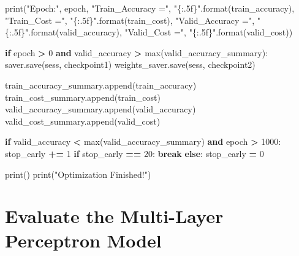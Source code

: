 \documentclass[]{book}
\newenvironment{Shaded}{\begin{snugshade}}{\end{snugshade}}
\newcommand{\KeywordTok}[1]{\textcolor[rgb]{0.13,0.29,0.53}{\textbf{#1}}}
\newcommand{\DecValTok}[1]{\textcolor[rgb]{0.00,0.00,0.81}{#1}}
\newcommand{\SpecialCharTok}[1]{\textcolor[rgb]{0.00,0.00,0.00}{#1}}
\newcommand{\StringTok}[1]{\textcolor[rgb]{0.31,0.60,0.02}{#1}}
\newcommand{\ControlFlowTok}[1]{\textcolor[rgb]{0.13,0.29,0.53}{\textbf{#1}}}
\newcommand{\OperatorTok}[1]{\textcolor[rgb]{0.81,0.36,0.00}{\textbf{#1}}}
\newcommand{\BuiltInTok}[1]{#1}
\newcommand{\NormalTok}[1]{#1}
\begin{document}
\begin{Shaded}
\begin{Highlighting}[]
        \BuiltInTok{print}\NormalTok{(}\StringTok{"Epoch:"}\NormalTok{, epoch,}
              \StringTok{"Train_Accuracy ="}\NormalTok{, }\StringTok{"}\SpecialCharTok{\{:.5f\}}\StringTok{"}\NormalTok{.}\BuiltInTok{format}\NormalTok{(train_accuracy),}
              \StringTok{"Train_Cost ="}\NormalTok{, }\StringTok{"}\SpecialCharTok{\{:.5f\}}\StringTok{"}\NormalTok{.}\BuiltInTok{format}\NormalTok{(train_cost), }
              \StringTok{"Valid_Accuracy ="}\NormalTok{, }\StringTok{"}\SpecialCharTok{\{:.5f\}}\StringTok{"}\NormalTok{.}\BuiltInTok{format}\NormalTok{(valid_accuracy),}
              \StringTok{"Valid_Cost ="}\NormalTok{, }\StringTok{"}\SpecialCharTok{\{:.5f\}}\StringTok{"}\NormalTok{.}\BuiltInTok{format}\NormalTok{(valid_cost))}

        \ControlFlowTok{if}\NormalTok{ epoch }\OperatorTok{>} \DecValTok{0} \KeywordTok{and}\NormalTok{ valid_accuracy }\OperatorTok{>} \BuiltInTok{max}\NormalTok{(valid_accuracy_summary):}
\NormalTok{            saver.save(sess, checkpoint1)}
\NormalTok{            weights_saver.save(sess, checkpoint2)}

\NormalTok{        train_accuracy_summary.append(train_accuracy)}
\NormalTok{        train_cost_summary.append(train_cost)}
\NormalTok{        valid_accuracy_summary.append(valid_accuracy)}
\NormalTok{        valid_cost_summary.append(valid_cost)}
       
        \ControlFlowTok{if}\NormalTok{ valid_accuracy }\OperatorTok{<} \BuiltInTok{max}\NormalTok{(valid_accuracy_summary) }\KeywordTok{and}\NormalTok{ epoch }\OperatorTok{>} \DecValTok{1000}\NormalTok{:}
\NormalTok{            stop_early }\OperatorTok{+=} \DecValTok{1}
            \ControlFlowTok{if}\NormalTok{ stop_early }\OperatorTok{==} \DecValTok{20}\NormalTok{:}
                \ControlFlowTok{break}
        \ControlFlowTok{else}\NormalTok{:}
\NormalTok{            stop_early }\OperatorTok{=} \DecValTok{0}

    \BuiltInTok{print}\NormalTok{()}
    \BuiltInTok{print}\NormalTok{(}\StringTok{"Optimization Finished!"}\NormalTok{)}
\end{Highlighting}
\end{Shaded}

\hypertarget{evaluate-the-multi-layer-perceptron-model}{%
\section{Evaluate the Multi-Layer Perceptron Model}\label{evaluate-the-multi-layer-perceptron-model}}
\end{document}
